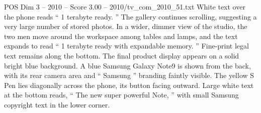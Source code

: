 \begin{textsample}{POS Dim 3 – 2010 – Score 3.00 – 2010/tv\_com\_2010\_51.txt}
White text over the phone reads “ 1 terabyte ready. ” The gallery continues scrolling, suggesting a very large number of stored photos.
In a wider, dimmer view of the studio, the two men move around the workspace among tables and lamps, and the text expands to read “ 1 terabyte ready with expandable memory. ” Fine-print legal text remains along the bottom.
The final product display appears on a solid bright blue background.
A blue Samsung Galaxy Note9 is shown from the back, with its rear camera area and “ Samsung ” branding faintly visible.
The yellow S Pen lies diagonally across the phone, its button facing outward.
Large white text at the bottom reads, “ The new super powerful Note, ” with small Samsung copyright text in the lower corner.

\end{textsample}
